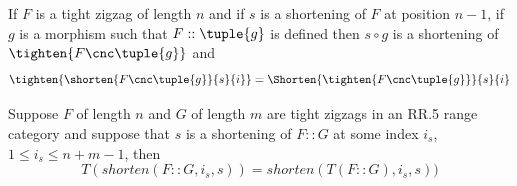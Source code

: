 \begin{lemma}
\begin{newtt}
If $F$ is a tight zigzag of length $n$ and if $s$ is a shortening of $F$ at 
position $n-1$, if $g$ is a morphism such that $F :: \tuple{g}$ is
defined then $s \circ g$ is a shortening of $\tighten{F\cnc\tuple{g}}$
and 
\[
\tighten{
  \shorten{F\cnc\tuple{g}}
          {s}{i}
        }
=\Shorten{\tighten{F\cnc\tuple{g}}}
         {s}{i}
\]
\end{newtt}
\end{lemma}
\begin{lemma}
\end{lemma}

\begin{lemma}
Suppose $F$ of length $n$ and $G$ of length $m$ are tight zigzags 
in an RR.5 range category \catcw 
and suppose that $s$ is a shortening
of $F::G$ at some index $i_s$, $1 \leq i_s \leq n +m - 1$, then
\begin{equation}
\label{associativitySublemmatarget}
T(shorten(F::G,i_s,s))=shorten(T(F::G),i_s,s))
\end{equation}
\end{lemma}
